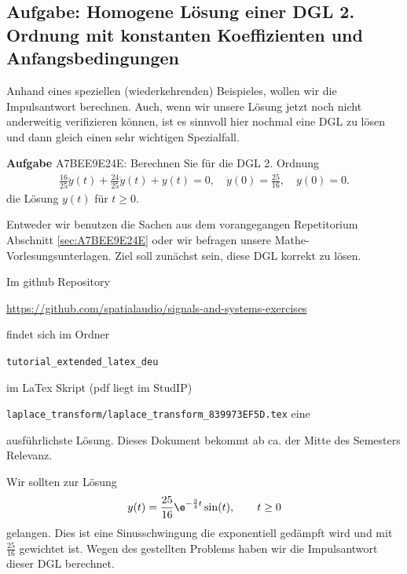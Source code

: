 \subsection{Aufgabe: Homogene Lösung einer DGL 2. Ordnung mit konstanten
Koeffizienten und Anfangsbedingungen}
\label{sec:A7BEE9E24E_Aufgabe}
\begin{Ziel}
Anhand eines speziellen (wiederkehrenden) Beispieles, wollen wir die Impulsantwort berechnen. Auch,
wenn wir unsere Lösung jetzt noch nicht anderweitig verifizieren können,
ist es sinnvoll hier nochmal eine DGL zu lösen und dann gleich einen sehr wichtigen
Spezialfall.
\end{Ziel}
\textbf{Aufgabe} {\tiny A7BEE9E24E}: Berechnen Sie für die DGL 2. Ordnung
\begin{align}
\frac{16}{25} \ddot{y}(t) + \frac{24}{25} \dot{y}(t) + y(t) = 0,
\quad \dot{y}(0)=\frac{25}{16}, \quad y(0)=0.
\end{align}
die Lösung $y(t)$ für $t\geq 0$.
\begin{Werkzeug}
Entweder wir benutzen die Sachen aus dem vorangegangen Repetitorium Abschnitt
\ref{sec:A7BEE9E24E} oder
wir befragen unsere Mathe-Vorlesungsunterlagen. Ziel soll zunächst sein, diese
DGL korrekt zu lösen.
\end{Werkzeug}
\begin{Ansatz}
Im github Repository

\url{https://github.com/spatialaudio/signals-and-systems-exercises}

findet sich im Ordner

\verb|tutorial_extended_latex_deu|

im LaTex Skript (pdf liegt im StudIP)

\verb|laplace_transform/laplace_transform_839973EF5D.tex| eine

ausführlichste Lösung.
Dieses Dokument bekommt ab ca. der Mitte des Semesters Relevanz.
\end{Ansatz}
\begin{Loesung}
Wir sollten zur Lösung
\begin{align}
y(t) = \frac{25}{16} \e^{-\frac{3}{4} t} \sin(t), \qquad t\geq 0
\end{align}
gelangen.
%
Dies ist eine Sinusschwingung die exponentiell gedämpft wird und mit
$\frac{25}{16}$ gewichtet ist.
Wegen des gestellten Problems haben wir die Impulsantwort dieser DGL berechnet.
\end{Loesung}
